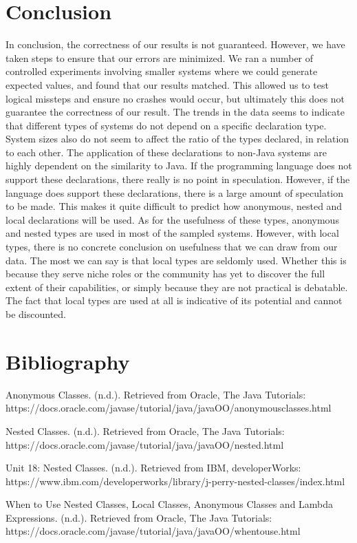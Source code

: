 \documentclass[12p]{article}
\newenvironment{hangingpar}[1]
  {\begin{list}
    {}
    {
      \setlength{\itemindent}{-#1}%
      \setlength{\leftmargin}{#1}%
      \setlength{\itemsep}{0pt}%
      \setlength{\parsep}{\parskip}%
      \setlength{\topsep}{\parskip}%
    }
    \setlength{\parindent}{-#1}%
    \item[]
  }
  {\end{list}}
\begin{document}
\section{Conclusion}

In conclusion, the correctness of our results is not guaranteed. However, we have taken steps to ensure that our errors are minimized. We ran a number of controlled experiments involving smaller systems where we could generate expected values, and found that our results matched. This allowed us to test logical missteps and ensure no crashes would occur, but ultimately this does not guarantee the correctness of our result. The trends in the data seems to indicate that different types of systems do not depend on a specific declaration type. System sizes also do not seem to affect the ratio of the types declared, in relation to each other. The application of these declarations to non-Java systems are highly dependent on the similarity to Java. If the programming language does not support these declarations, there really is no point in speculation. However, if the language does support these declarations, there is a large amount of speculation to be made. This makes it quite difficult to predict how anonymous, nested and local declarations will be used. As for the usefulness of these types, anonymous and nested types are used in most of the sampled systems. However, with local types, there is no concrete conclusion on usefulness that we can draw from our data. The most we can say is that local types are seldomly used. Whether this is because they serve niche roles or the community has yet to discover the full extent of their capabilities, or simply because they are not practical is debatable. The fact that local types are used at all is indicative of its potential and cannot be discounted.

\section{Bibliography}
\begin{hangingpar}{2em}
  \item Anonymous Classes. (n.d.). Retrieved from Oracle, The Java Tutorials:\\ https://docs.oracle.com/javase/tutorial/java/javaOO/anonymousclasses.html
  \item Nested Classes. (n.d.). Retrieved from Oracle, The Java Tutorials:\\ https://docs.oracle.com/javase/tutorial/java/javaOO/nested.html
  \item Unit 18: Nested Classes. (n.d.). Retrieved from IBM, developerWorks:\\ https://www.ibm.com/developerworks/library/j-perry-nested-classes/index.html
  \item When to Use Nested Classes, Local Classes, Anonymous Classes and Lambda Expressions. (n.d.). Retrieved from Oracle, The Java Tutorials:\\ https://docs.oracle.com/javase/tutorial/java/javaOO/whentouse.html
\end{hangingpar}
\end{document}
